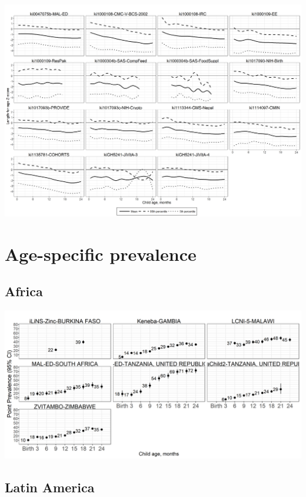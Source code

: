 \documentclass[9pt,]{book}
\begin{document}
\includegraphics[width=58.33in]{figure-copies/fig-laz-2-quant-cohort-asia-allage-primary}

\hypertarget{age-specific-prevalence}{%
\section{Age-specific prevalence}\label{age-specific-prevalence}}

\hypertarget{africa-1}{%
\subsection{Africa}\label{africa-1}}

\includegraphics[width=41.67in]{figure-copies/fig-stunt-2-prev-cohort-africa-allage-primary}

\hypertarget{latin-america-1}{%
\subsection{Latin America}\label{latin-america-1}}
\end{document}
